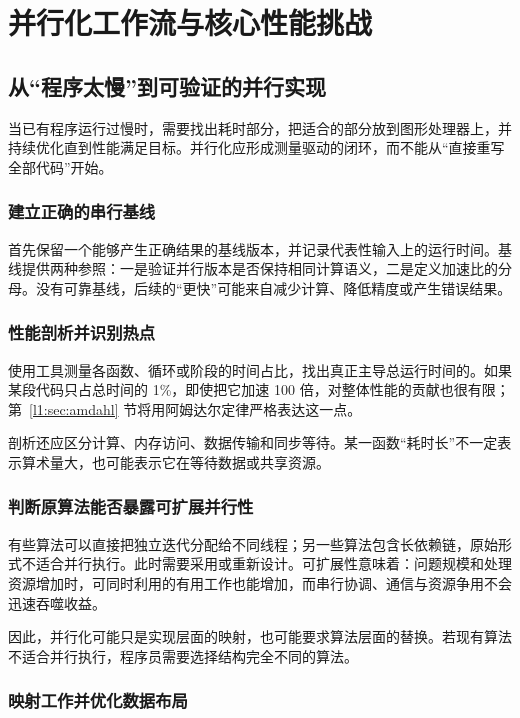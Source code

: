 \section{并行化工作流与核心性能挑战}

\subsection{从“程序太慢”到可验证的并行实现}

当已有程序运行过慢时，需要找出耗时部分，把适合的部分放到图形处理器上，并持续优化直到性能满足目标。并行化应形成测量驱动的闭环，而不能从“直接重写全部代码”开始。

\subsubsection{建立正确的串行基线}

首先保留一个能够产生正确结果的基线版本，并记录代表性输入上的运行时间。基线提供两种参照：一是验证并行版本是否保持相同计算语义，二是定义加速比的分母。没有可靠基线，后续的“更快”可能来自减少计算、降低精度或产生错误结果。

\subsubsection{性能剖析并识别热点}

使用工具测量各函数、循环或阶段的时间占比，找出真正主导总运行时间的。如果某段代码只占总时间的 1\%，即使把它加速 100 倍，对整体性能的贡献也很有限；第~\ref{l1:sec:amdahl} 节将用阿姆达尔定律严格表达这一点。

剖析还应区分计算、内存访问、数据传输和同步等待。某一函数“耗时长”不一定表示算术量大，也可能表示它在等待数据或共享资源。

\subsubsection{判断原算法能否暴露可扩展并行性}

有些算法可以直接把独立迭代分配给不同线程；另一些算法包含长依赖链，原始形式不适合并行执行。此时需要采用或重新设计。可扩展性意味着：问题规模和处理资源增加时，可同时利用的有用工作也能增加，而串行协调、通信与资源争用不会迅速吞噬收益。

因此，并行化可能只是实现层面的映射，也可能要求算法层面的替换。若现有算法不适合并行执行，程序员需要选择结构完全不同的算法。

\subsubsection{映射工作并优化数据布局}

